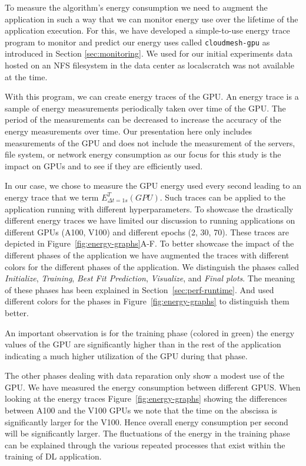 To measure the algorithm's energy consumption we need to augment the application in such a way that we can monitor energy use over the lifetime of the application execution. For this, we have developed a simple-to-use energy trace program to monitor and predict our energy uses called \verb|cloudmesh-gpu| as introduced in Section \ref{sec:monitoring}.  We used for our initial experiments data hosted on an NFS filesystem in the data center as localscratch was not available at the time.


With this program, we can create energy traces of the GPU. An energy trace is a sample of energy measurements periodically taken over time of the GPU. The period of the measurements can be decreased to increase the accuracy of the energy measurements over time. Our presentation here only includes measurements of the GPU and does not include the measurement of the servers, file system, or network energy consumption as our focus for this study is the impact on GPUs and to see if they are efficiently used.

In our case, we chose to measure the GPU energy used every second leading to an energy trace that we term $E^T_{\Delta t=1s}(GPU)$. Such traces can be applied to the application running with different hyperparameters. To showcase the drastically different energy traces we have limited our discussion to running applications on different GPUs (A100, V100) and different epochs (2, 30, 70). These traces are depicted in Figure~\ref{fig:energy-graphs}A-F.  To better showcase the impact of the different phases of the application we have augmented the traces with different colors for the different phases of the application.  We distinguish the phases called {\em Initialize}, {\em Training}, {\em Best Fit Prediction}, {\em Visualize}, and {\em Final plots}. The meaning of these phases has been explained in Section~\ref{sec:perf-runtime}. And used different colors for the phases in Figure~\ref{fig:energy-graphs} to distinguish them better.

An important observation is for the training phase (colored in green) the energy values of the GPU are significantly higher than in the rest of the application indicating a much higher utilization of the GPU during that phase.

The other phases dealing with data reparation only show a modest use of the GPU. We have measured the energy consumption between different GPUS.  When looking at the energy traces Figure~\ref{fig:energy-graphs} showing the differences between A100 and the V100 GPUs we note that the time on the abscissa is significantly larger for the V100. Hence overall energy consumption per second will be significantly larger. The fluctuations of the energy in the training phase can be explained through the various repeated processes that exist within the training of DL application.

